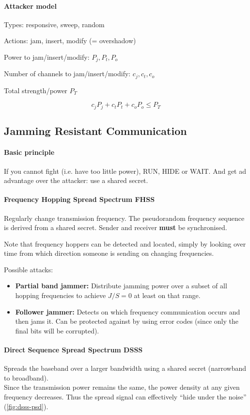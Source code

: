 \paragraph{Attacker model}
Types: responsive, sweep, random 

Actions: jam, insert, modify (= overshadow) 

Power to jam/insert/modify: $P_j, P_t, P_o$ 

Number of channels to jam/insert/modify: $c_j, c_t, c_o$ 

Total strength/power $P_T$ 

$$ c_j P_j + c_t P_t + c_o P_o \leq P_T$$

\subsection{Jamming Resistant Communication}\label{sec:jamming-resistant-comm}

\paragraph{Basic principle}
If you cannot fight (i.e. have too little power), RUN, HIDE or WAIT.
And get ad advantage over the attacker: use a shared secret.

\paragraph{Frequency Hopping Spread Spectrum FHSS}
Regularly change transmission frequency.
The pseudorandom frequency sequence is derived from a shared secret.
Sender and receiver \textbf{must} be synchronised.

Note that frequency hoppers can be detected and located, simply by looking over time from which direction someone is sending on changing frequencies.

Possible attacks:
\begin{itemize}
	\item \textbf{Partial band jammer:}
	Distribute jamming power over a subset of all hopping frequencies to achieve $J/S=0$ at least on that range.
	\item \textbf{Follower jammer:}
	Detects on which frequency communication occurs and then jams it.
	Can be protected against by using error codes (since only the final bits will be corrupted).
\end{itemize}

\paragraph{Direct Sequence Spread Spectrum DSSS}
Spreads the baseband over a larger bandwidth using a shared secret (narrowband to broadband). \\
Since the transmission power remains the same, the power density at any given frequency decreases.
Thus the spread signal can effectively ``hide under the noise'' (\autoref{fig:dsss-psd}).

